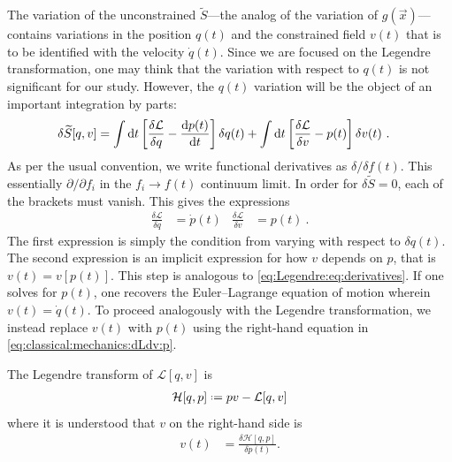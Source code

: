 The variation of the unconstrained $\tilde S$---the analog of the variation of $g(\vec{x})$---contains variations in the position $q(t)$ and the constrained field $v(t)$ that is to be identified with the velocity $\dot q(t)$. Since we are focused on the Legendre transformation, one may think that the variation with respect to $q(t)$ is not significant for our study. However, the $q(t)$ variation will be the object of an important integration by parts:
\begin{align}
    \delta \widetilde{S}[q,v]
    &= \int \operatorname{d}\mkern-3mu^{}\mkern-1mu{t}
    \left[
        \frac{\delta \mathcal L}{\delta q} 
        - 
        \frac{\operatorname{d}\mkern-3mu^{}\mkern-1mu{p}(t)}{\operatorname{d}\mkern-3mu^{}\mkern-1mu{t}}
    \right] \delta q(t)
    +
    \int \operatorname{d}\mkern-3mu^{}\mkern-1mu{t}
    \left[
        \frac{\delta \mathcal L}{\delta v} 
        - 
        p(t)
    \right] \delta v(t) \ .
\end{align}
As per the usual convention, we write functional derivatives as $\delta/\delta f(t)$. This essentially $\partial/\partial{f_i}$ in the $f_i\to f(t)$ continuum limit.
In order for $\delta \tilde S = 0$, each of the brackets must vanish. This gives the expressions
\begin{align}
    \frac{\delta \mathcal L}{\delta q} 
    &= \dot p(t)
    &
    \frac{\delta \mathcal L}{\delta v}
    &= p(t) 
    \ . 
    \label{eq:classical:mechanics:dLdv:p}
\end{align}
The first expression is simply the condition from varying with respect to $\delta q(t)$. The second expression is an implicit expression for how $v$ depends on $p$, that is $v(t)=v[p(t)]$. This step is analogous to \eqref{eq:Legendre:eq:derivatives}. If one solves for $p(t)$, one recovers the Euler--Lagrange equation of motion wherein $v(t) = \dot q(t)$. To proceed analogously with the Legendre transformation, we instead replace $v(t)$ with $p(t)$ using the right-hand equation in \eqref{eq:classical:mechanics:dLdv:p}.

The Legendre transform of $\mathcal L[q,v]$ is 
\begin{align}
    \mathcal H[q,p] \defeq p v - \mathcal L[q,v]
\end{align}
where it is understood that $v$ on the right-hand side is
\begin{align}
    v(t) &= \frac{\delta \mathcal H[q,p]}{\delta p(t)}.
\end{align}

